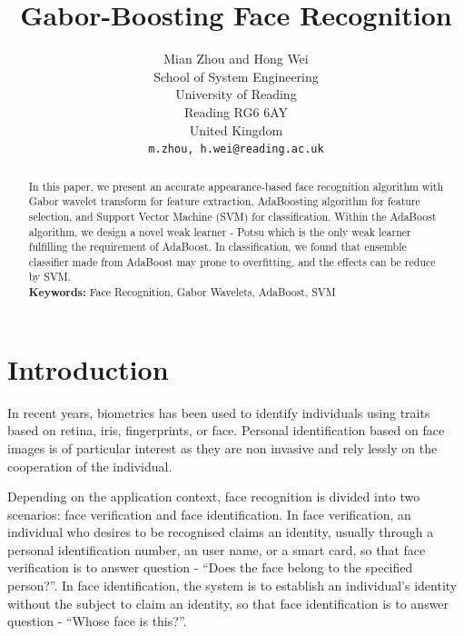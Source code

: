 \documentclass[a4paper,10pt]{article}
\title{Gabor-Boosting Face Recognition}
\author{Mian Zhou and Hong Wei\\
\small School of System Engineering\\[-0.8ex]
\small University of Reading\\
\small Reading RG6 6AY\\
\small United Kingdom\\
\small \texttt{m.zhou, h.wei@reading.ac.uk}
}
\begin{document}
\maketitle


\begin{abstract}
In this paper, we present an accurate appearance-based face recognition algorithm with Gabor wavelet transform for feature extraction, AdaBoosting algorithm for feature selection, and Support Vector Machine (SVM) for classification. Within the AdaBoost algorithm, we design a novel weak learner - Potsu which is the only weak learner fulfilling the requirement of AdaBoost. In classification, we found that ensemble classifier made from AdaBoost may prone to overfitting, and the effects can be reduce by SVM.\\

\textbf{Keywords:} Face Recognition, Gabor Wavelets, AdaBoost, SVM
\end{abstract}


\section{Introduction}
\label{intro}
In recent years, biometrics has been used to identify individuals using traits based on retina, iris, fingerprints, or face. Personal identification based on face images is of particular interest as they are non invasive and rely lessly on the cooperation of the individual. 

Depending on the application context, face recognition is divided into two scenarios: face verification and face identification. In face verification, an individual who desires to be recognised claims an identity, usually through a personal identification number, an user name, or a smart card, so that face verification is to answer question - ``Does the face belong to the specified person?''. In face identification, the system is to establish an individual's identity without the subject to claim an identity, so that face identification is to answer question - ``Whose face is this?''.
\end{document}
